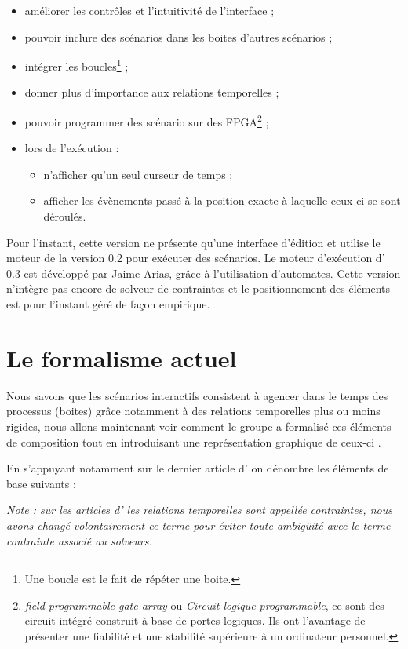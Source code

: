\begin{itemize}
    \item améliorer les contrôles et l'intuitivité de l'interface ;
    \item pouvoir inclure des scénarios dans les boites d'autres scénarios ;
    \item intégrer les boucles\footnote{Une boucle est le fait de répéter une boite.} ;
    \item donner plus d'importance aux relations temporelles ;
    \item pouvoir programmer des scénario sur des FPGA\footnote{\emph{field-programmable gate array} ou \emph{Circuit logique programmable}, ce sont des circuit intégré construit à base de portes logiques. Ils ont l'avantage de présenter une fiabilité et une stabilité supérieure à un ordinateur personnel.} ;
    \item lors de l'exécution :
    \begin{itemize}
        \item n'afficher qu'un seul curseur de temps ;
        \item afficher les évènements passé à la position exacte à laquelle ceux-ci se sont déroulés.
    \end{itemize}
\end{itemize}

Pour l'instant, cette version ne présente qu'une interface d'édition et utilise le moteur de la version 0.2 pour exécuter des scénarios. Le moteur d'exécution d'\iscore{} 0.3 est développé par Jaime Arias, grâce à l'utilisation d'automates.
Cette version n'intègre pas encore de solveur de contraintes et le positionnement des éléments est pour l'instant géré de façon empirique.

\section{Le formalisme actuel}

Nous savons que les scénarios interactifs consistent à agencer dans le temps des processus (boites) grâce notamment à des relations temporelles plus ou moins rigides, nous allons maintenant voir comment le groupe \ossia{} a formalisé ces éléments de composition tout en introduisant une représentation graphique de ceux-ci .

En s'appuyant notamment sur le dernier article d'\ossia{}\cite{ossia2015interface} on dénombre les éléments de base suivants :

\emph{Note : sur les articles d'\ossia{} les relations temporelles sont appellée contraintes, nous avons changé volontairement ce terme pour éviter toute ambigüité avec le terme contrainte associé au solveurs.}

